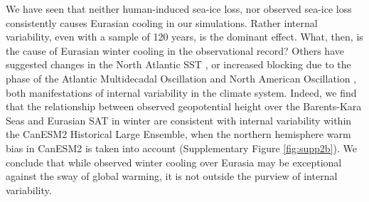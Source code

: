 \documentclass{nature}
\begin{document}

We have seen that neither human-induced sea-ice loss, nor observed sea-ice loss consistently causes Eurasian cooling in our simulations. Rather internal variability, even with a sample of 120 years, is the dominant effect. What, then, is the cause of Eurasian winter cooling in the observational record? Others have suggested changes in the North Atlantic SST \cite{sato14}, or increased blocking due to the phase of the Atlantic Multidecadal Oscillation and North American Oscillation \cite{peings14b}, both manifestations of internal variability in the climate system. Indeed, we find that the relationship between observed geopotential height over the Barents-Kara Seas and Eurasian SAT in winter are consistent with internal variability within the CanESM2 Historical Large Ensemble, when the northern hemisphere warm bias in CanESM2 is taken into account (Supplementary Figure \ref{fig:supp2b}). We conclude that while observed winter cooling over Eurasia may be exceptional against the sway of global warming, it is not outside the purview of internal variability.



\end{document}
